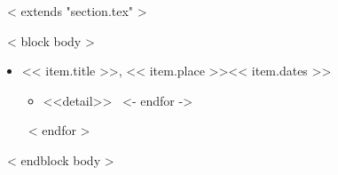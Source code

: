 ~< extends "section.tex" >~

~< block body >~
  \begin{itemize}
    ~< for item in items >~
      \item << item.title >>, << item.place >>\hfill << item.dates >>
        \begin{itemize}
          ~< for detail in item.details ->~
            \item <<detail>>
          ~<- endfor ->~
        \end{itemize}
    ~< endfor >~
  \end{itemize}
~< endblock body >~
